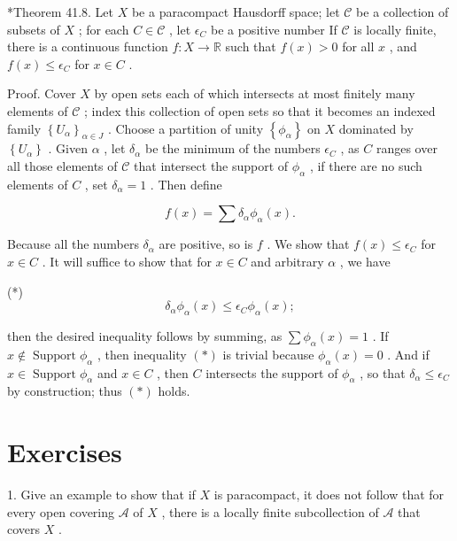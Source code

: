 *Theorem 41.8. Let \(X\) be a paracompact Hausdorff space; let \(\mathcal{C}\) be a collection of subsets of \(X\) ; for each \(C \in  \mathcal{C}\) , let \({\epsilon }_{C}\) be a positive number If \(\mathcal{C}\) is locally finite, there is a continuous function \(f : X \rightarrow  \mathbb{R}\) such that \(f\left( x\right)  > 0\) for all \(x\) , and \(f\left( x\right)  \leq  {\epsilon }_{C}\) for \(x \in  C\) .

Proof. Cover \(X\) by open sets each of which intersects at most finitely many elements of \(\mathcal{C}\) ; index this collection of open sets so that it becomes an indexed family \({\left\{  {U}_{\alpha }\right\}  }_{\alpha  \in  J}\) . Choose a partition of unity \(\left\{  {\phi }_{\alpha }\right\}\) on \(X\) dominated by \(\left\{  {U}_{\alpha }\right\}\) . Given \(\alpha\) , let \({\delta }_{\alpha }\) be the minimum of the numbers \({\epsilon }_{C}\) , as \(C\) ranges over all those elements of \(\mathcal{C}\) that intersect the support of \({\phi }_{\alpha }\) , if there are no such elements of \(C\) , set \({\delta }_{\alpha } = 1\) . Then define

\[
f\left( x\right)  = \sum {\delta }_{\alpha }{\phi }_{\alpha }\left( x\right) .
\]

Because all the numbers \({\delta }_{\alpha }\) are positive, so is \(f\) . We show that \(f\left( x\right)  \leq  {\epsilon }_{C}\) for \(x \in  C\) . It will suffice to show that for \(x \in  C\) and arbitrary \(\alpha\) , we have

(*)
\[
{\delta }_{\alpha }{\phi }_{\alpha }\left( x\right)  \leq  {\epsilon }_{C}{\phi }_{\alpha }\left( x\right) ;
\]

then the desired inequality follows by summing, as \(\sum {\phi }_{\alpha }\left( x\right)  = 1\) . If \(x \notin  \operatorname{Support}{\phi }_{\alpha }\) , then inequality \(\left( *\right)\) is trivial because \({\phi }_{\alpha }\left( x\right)  = 0\) . And if \(x \in  \operatorname{Support}{\phi }_{\alpha }\) and \(x \in  C\) , then \(C\) intersects the support of \({\phi }_{\alpha }\) , so that \({\delta }_{\alpha } \leq  {\epsilon }_{C}\) by construction; thus \(\left( *\right)\) holds.

\section*{Exercises}

1. Give an example to show that if \(X\) is paracompact, it does not follow that for every open covering \(\mathcal{A}\) of \(X\) , there is a locally finite subcollection of \(\mathcal{A}\) that covers \(X\) .

